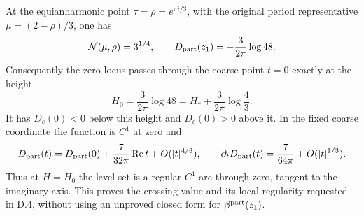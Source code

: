 \begin{proposition}\label{push:src:D.4.5}
At the equianharmonic point \(\tau=\rho=e^{\pi i/3}\), with the
original period representative \(\mu=(2-\rho)/3\), one has
\[
 \mathcal N(\mu,\rho)=3^{1/4},\qquad
 D_{\rm part}(z_1)=-\frac3{2\pi}\log48.
\]
Consequently the zero locus passes through the coarse point \(t=0\)
exactly at the height
\[
 H_0=\frac3{2\pi}\log48
 =H_*+\frac3{2\pi}\log\frac43.
\]
It has \(D_c(0)<0\) below this height and \(D_c(0)>0\) above it.
In the fixed coarse coordinate the function is \(C^1\) at zero and
\[
 D_{\rm part}(t)=D_{\rm part}(0)
       +\frac7{32\pi}\operatorname{Re}t+O(|t|^{4/3}),\qquad
 \partial_tD_{\rm part}(t)=\frac7{64\pi}+O(|t|^{1/3}).
\]
Thus at \(H=H_0\) the level set is a regular \(C^1\) arc through
zero, tangent to the imaginary axis. This proves the crossing value
and its local regularity requested in D.4, without using an unproved
closed form for \(\beta^{\rm part}(z_1)\).
\end{proposition}
